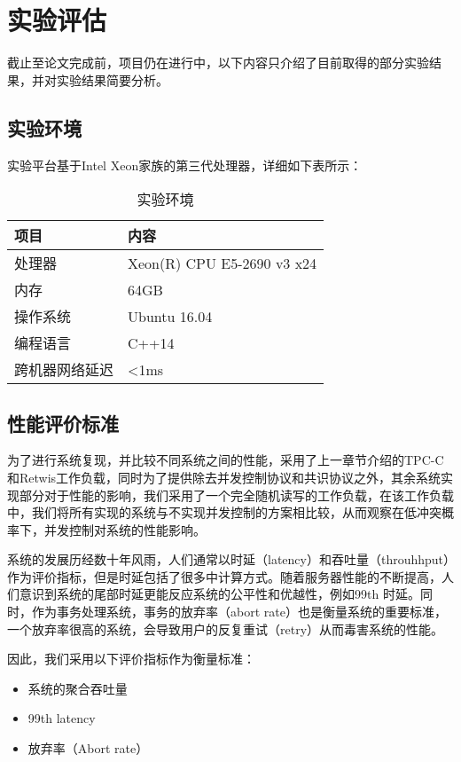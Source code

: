
\chapter{实验评估}

截止至论文完成前，项目仍在进行中，以下内容只介绍了目前取得的部分实验结果，并对实验结果简要分析。

\section{实验环境}
实验平台基于Intel Xeon家族的第三代处理器，详细如下表所示：

\begin{table}[htb]
  \centering\small
  \caption{实验环境}
  \label{tab:ex1}
  \begin{tabular}{p{90pt}p{180pt}}
    \toprule
    项目    & 内容\\
    \midrule
    处理器  &  Xeon(R) CPU E5-2690 v3 x24 \\
    内存    &  64GB\\
    操作系统&  Ubuntu 16.04  \\
    编程语言&  C++14\\
    跨机器网络延迟 & <1ms\\

    \bottomrule
  \end{tabular}
\end{table}

\section{性能评价标准}
为了进行系统复现，并比较不同系统之间的性能，采用了上一章节介绍的TPC-C和Retwis工作负载，同时为了提供除去并发控制协议和共识协议之外，其余系统实现部分对于性能的影响，我们采用了一个完全随机读写的工作负载，在该工作负载中，我们将所有实现的系统与不实现并发控制的方案相比较，从而观察在低冲突概率下，并发控制对系统的性能影响。

系统的发展历经数十年风雨，人们通常以时延（latency）和吞吐量（throuhhput）作为评价指标，但是时延包括了很多中计算方式。随着服务器性能的不断提高，人们意识到系统的尾部时延更能反应系统的公平性和优越性，例如99th 时延。同时，作为事务处理系统，事务的放弃率（abort rate）也是衡量系统的重要标准，一个放弃率很高的系统，会导致用户的反复重试（retry）从而毒害系统的性能。

因此，我们采用以下评价指标作为衡量标准：


\begin{itemize}
\item 系统的聚合吞吐量
\item 99th latency
\item 放弃率（Abort rate）
\end{itemize}

